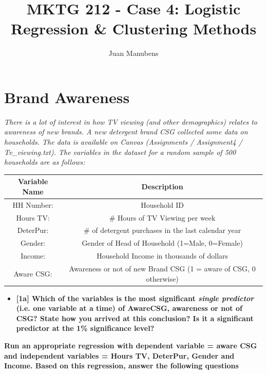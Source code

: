 \documentclass[10pt, oneside,spanish]{article}
\title{MKTG 212 - Case 4: Logistic Regression \& Clustering Methods} \lstset{language=R}
\author[]{Juan Manubens}
\affil[]{University of Pennsylvania}
\date{}
\begin{document}
\maketitle







\section{Brand Awareness}

\textit{There is a lot of interest in how TV viewing (and other demographics) relates to awareness of new brands. A new detergent brand CSG collected some data on households. The data is available on Canvas (Assignments / Assignment4 / Tv\_viewing.txt).  The variables in the dataset for a random sample of 500 households are as follows:}\\

\begin{center}
\begin{tabular}{ | c | c |  }
 \hline
\textbf{Variable Name} & \textbf{Description}  \\
 \hline
 HH Number: & Household ID  \\
 \hline
Hours TV: & \# Hours of TV Viewing per week \\ 
 \hline
DeterPur: & \# of detergent purchases in the last calendar year
  \\
  \hline
Gender: & Gender of Head of Household (1=Male, 0=Female)  \\
  \hline
Income: & Household Income in thousands of dollars  \\
  \hline
Aware CSG: & Awareness or not of new Brand CSG (1 = aware of CSG, 0 otherwise)
  \\
  \hline
\end{tabular}
\end{center}
\medskip

\pagebreak

\begin{itemize}
\item \textbf{[1a] Which of the variables is the most significant \textit{single predictor} (i.e. one variable at a time) of AwareCSG, awareness or not of CSG?  State how you arrived at this conclusion?  Is it a significant predictor at the 1\% significance level?  }
\end{itemize}

\textbf{Run an appropriate regression with dependent variable = aware CSG and independent variables = Hours TV, DeterPur, Gender and Income.  Based on this regression, answer the following questions}
\end{document}
